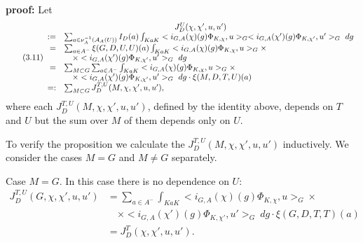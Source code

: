 \documentclass[12pt]{article}
\newenvironment{pf}[1][proof:]{\par\medskip\noindent\textbf{#1} }{\par\medskip}
\begin{document}
\begin{pf}
Let
\begin{equation}\tag{3.11}
\begin{array}{rl}
\multicolumn{2}{c}{J_D^U(\chi,\chi',u,u')}\\
:=&\sum_{a\in\nu_A^{-1}(\mathcal{A}_A(U))}I_D(a)\int_{KaK}<i_{G,A}(\chi)(g)\Phi_{K,\chi},u>_G<i_{G,A}(\chi')(g)\Phi_{K,\chi'},u'>_G\ dg\\
=&\sum_{a\in A^-}\xi(G,D,U,U)(a)\int_{KaK}<i_{G,A}(\chi)(g)\Phi_{K,\chi},u>_G\times\\
&\quad\times<i_{G,A}(\chi')(g)\Phi_{K,\chi'},u'>_G\ dg\\
=&\sum_{M\subset G}\sum_{a\in A^-}\int_{KaK}<i_{G,A}(\chi)(g)\Phi_{K,\chi},u>_G\times\\
&\quad\times<i_{G,A}(\chi')(g)\Phi_{K,\chi'},u'>_G\ dg\cdot\xi(M,D,T,U)(a)\\
=:&\sum_{M\subset G}J^{T,U}_D(M,\chi,\chi',u,u'),
\end{array}
\end{equation}
where each $J^{T,U}_D(M,\chi,\chi',u,u')$, defined by the identity above, depends on $T$ and $U$ but the sum over $M$ of them depends only on $U$.

To verify the proposition we calculate the $J^{T,U}_D(M,\chi,\chi',u,u')$ inductively. We consider the cases $M=G$ and $M\neq G$ separately.

Case $M=G$. In this case there is no dependence on $U$:
\begin{equation}\tag{3.12}
\begin{array}{rl}
J^{T,U}_D(G,\chi,\chi',u,u')&=\sum_{a\in A^-}\int_{KaK}<i_{G,A}(\chi)(g)\Phi_{K,\chi},u>_G\times\\
&\quad\times<i_{G,A}(\chi')(g)\Phi_{K,\chi'},u'>_G\ dg\cdot\xi(G,D,T,T)(a)\\
&=J^T_D(\chi,\chi',u,u').
\end{array}
\end{equation}


\end{pf}
\end{document}
